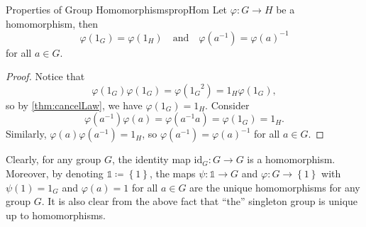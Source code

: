\documentclass[math]{amznotes}
\theoremstyle{remark}
\newcommand{\0}{\mathbf{0}}
\newcommand{\1}{\mathbf{1}}
\begin{document}
\begin{probox}{Properties of Group Homomorphisms}{propHom}
    Let $\varphi \colon G \to H$ be a homomorphism, then 
    \begin{equation*}
        \varphi\left(1_G\right) = \varphi\left(1_H\right) \quad\textrm{and}\quad \varphi\left(a^{-1}\right) = \varphi\left(a\right)^{-1}
    \end{equation*}
    for all $a \in G$.
    \tcblower
    \begin{proof}
        Notice that 
        \begin{equation*}
            \varphi\left(1_G\right)\varphi\left(1_G\right) = \varphi\left({1_G}^2\right) = 1_H\varphi\left(1_G\right),
        \end{equation*}
        so by \ref{thm:cancelLaw}, we have $\varphi\left(1_G\right) = 1_H$. Consider 
        \begin{equation*}
            \varphi\left(a^{-1}\right)\varphi\left(a\right) = \varphi\left(a^{-1}a\right) = \varphi\left(1_G\right) = 1_H.
        \end{equation*}
        Similarly, $\varphi\left(a\right)\varphi\left(a^{-1}\right) = 1_H$, so $\varphi\left(a^{-1}\right) = \varphi\left(a\right)^{-1}$ for all $a \in G$.
    \end{proof}
\end{probox}
Clearly, for any group $G$, the identity map $\mathrm{id}_G\colon G \to G$ is a homomorphism. Moreover, by denoting $\mathbb{1} \coloneqq \left\{1\right\}$, the maps $\psi \colon \mathbb{1} \to G$ and $\varphi \colon G \to \left\{1\right\}$ with $\psi\left(1\right) = 1_G$ and $\varphi\left(a\right) = 1$ for all $a \in G$ are the unique homomorphisms for any group $G$. It is also clear from the above fact that ``the'' singleton group is unique up to homomorphisms.
\end{document}
